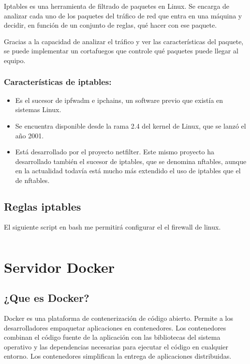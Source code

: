 			Iptables es una herramienta de filtrado de paquetes en Linux. Se encarga de analizar cada uno de los paquetes del tráfico de red que entra en una máquina y decidir, en función de un conjunto de reglas, qué hacer con ese paquete.
			
			Gracias a la capacidad de analizar el tráfico y ver las características del paquete, se puede implementar un cortafuegos que controle qué paquetes puede llegar al equipo.
			
			\subsubsection{Características de iptables:}
			
				\begin{itemize}
					\item Es el sucesor de ipfwadm e ipchains, un software previo que existía en sistemas Linux.
				
					\item Se encuentra disponible desde la rama 2.4 del kernel de Linux, que se lanzó el año 2001.
				
					\item Está desarrollado por el proyecto netfilter. Este mismo proyecto ha desarrollado también el sucesor de iptables, que se denomina nftables, aunque en la actualidad todavía está mucho más extendido el uso de iptables que el de nftables.
					
				\end{itemize}		
			
			\subsection{Reglas iptables}
			
				El siguiente script en bash me permitirá configurar el el firewall de linux.
			
				\inputminted{bash}{documentos/firewall/firewall.sh}
	
			
	\section{Servidor Docker}
	
		\subsection{¿Que es Docker?}
		
			Docker es una plataforma de contenerización de código abierto. Permite a los desarrolladores empaquetar aplicaciones en contenedores. Los contenedores combinan el código fuente de la aplicación con las bibliotecas del sistema operativo y las dependencias necesarias para ejecutar el código en cualquier entorno. Los contenedores simplifican la entrega de aplicaciones distribuidas.\par
			
